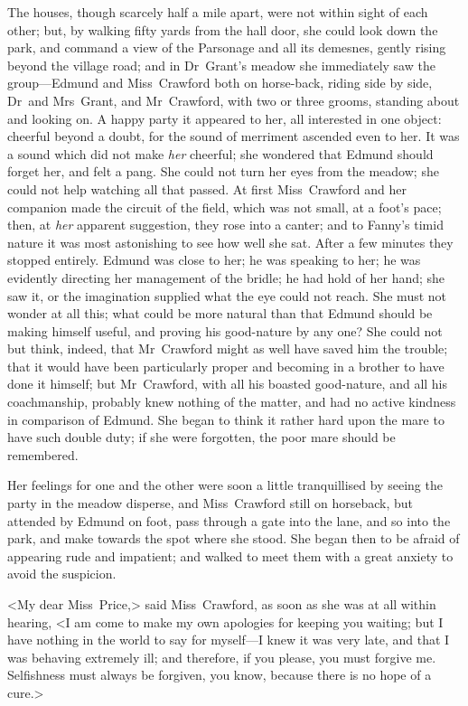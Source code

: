 The houses, though scarcely half a mile apart, were not within sight of each other; but, by walking fifty yards from the hall door, she could look down the park, and command a view of the Parsonage and all its demesnes, gently rising beyond the village road; and in Dr~Grant's meadow she immediately saw the group—Edmund and Miss~Crawford both on horse-back, riding side by side, Dr~and Mrs~Grant, and Mr~Crawford, with two or three grooms, standing about and looking on. A happy party it appeared to her, all interested in one object: cheerful beyond a doubt, for the sound of merriment ascended even to her. It was a sound which did not make \textit{her}  cheerful; she wondered that Edmund should forget her, and felt a pang. She could not turn her eyes from the meadow; she could not help watching all that passed. At first Miss~Crawford and her companion made the circuit of the field, which was not small, at a foot's pace; then, at \textit{her}  apparent suggestion, they rose into a canter; and to Fanny's timid nature it was most astonishing to see how well she sat. After a few minutes they stopped entirely. Edmund was close to her; he was speaking to her; he was evidently directing her management of the bridle; he had hold of her hand; she saw it, or the imagination supplied what the eye could not reach. She must not wonder at all this; what could be more natural than that Edmund should be making himself useful, and proving his good-nature by any one? She could not but think, indeed, that Mr~Crawford might as well have saved him the trouble; that it would have been particularly proper and becoming in a brother to have done it himself; but Mr~Crawford, with all his boasted good-nature, and all his coachmanship, probably knew nothing of the matter, and had no active kindness in comparison of Edmund. She began to think it rather hard upon the mare to have such double duty; if she were forgotten, the poor mare should be remembered.

Her feelings for one and the other were soon a little tranquillised by seeing the party in the meadow disperse, and Miss~Crawford still on horseback, but attended by Edmund on foot, pass through a gate into the lane, and so into the park, and make towards the spot where she stood. She began then to be afraid of appearing rude and impatient; and walked to meet them with a great anxiety to avoid the suspicion.

<My dear Miss~Price,> said Miss~Crawford, as soon as she was at all within hearing, <I am come to make my own apologies for keeping you waiting; but I have nothing in the world to say for myself—I knew it was very late, and that I was behaving extremely ill; and therefore, if you please, you must forgive me. Selfishness must always be forgiven, you know, because there is no hope of a cure.>

